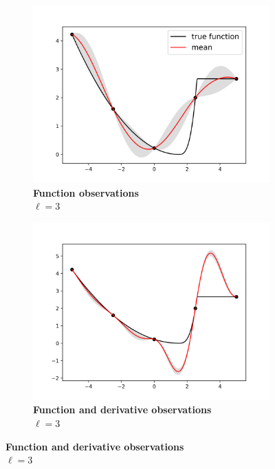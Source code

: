 \documentclass{article}
\begin{document}
\begin{figure}[H]
		\centering
		\captionsetup{justification=centering}
    \begin{subfigure}[t]{.33\textwidth}
      \centering
      \includegraphics[scale=0.35]{figures/kink-noder.png}
      \caption{\textbf{Function observations} \\ $\ell = 3$}
    \end{subfigure}%
    \begin{subfigure}[t]{.33\textwidth}
      \centering
      \includegraphics[scale=0.35]{figures/kink-der.png}
      \caption{\textbf{Function and derivative observations} \\ $\ell = 3$}
    \end{subfigure}%

\end{figure}
\end{document}
